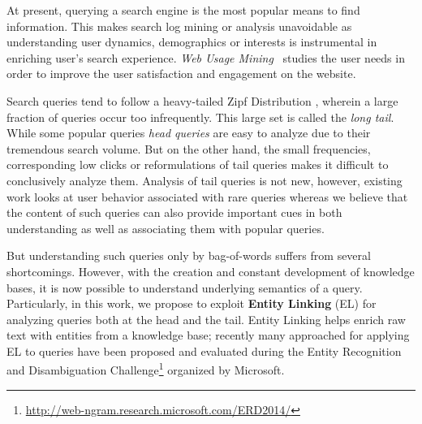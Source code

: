 At present, querying a search engine is the most popular means to find information. This makes
search log mining or analysis unavoidable as understanding user dynamics, demographics or interests
is instrumental in enriching user's search experience. \emph{Web Usage Mining}~\cite{silvestri2010mining}  
studies the user needs in order to improve the user satisfaction and engagement on the website. 

Search queries tend to follow a heavy-tailed Zipf Distribution \cite{baeza2007impact}, wherein a large 
fraction of queries occur too infrequently. This large set is called the \emph{long tail}. While some 
popular queries \emph{head queries} are easy to analyze due to their tremendous search volume. 
But on the other hand, the small frequencies, corresponding low clicks or reformulations 
of tail queries makes it difficult to conclusively analyze them. Analysis of tail queries is not new, 
however, existing work \cite{Doug2007Sigir,Goel2010Wsdm} looks at user behavior associated with
rare queries whereas we believe that the content of such queries can also provide important cues in both
understanding as well as associating them with popular queries. 

But understanding such queries only by bag-of-words suffers from several shortcomings. However, with the 
creation and constant development of knowledge bases, it is now possible to understand underlying semantics
of a query. Particularly, in this work, we propose to exploit \textbf{Entity Linking} (EL) for analyzing queries 
both at the head and the tail. Entity Linking helps enrich raw text with entities from a knowledge base; recently 
many approached for applying EL to queries have been proposed and evaluated during the Entity Recognition and Disambiguation Challenge\footnote{\url{http://web-ngram.research.microsoft.com/ERD2014/}} organized by Microsoft. 



